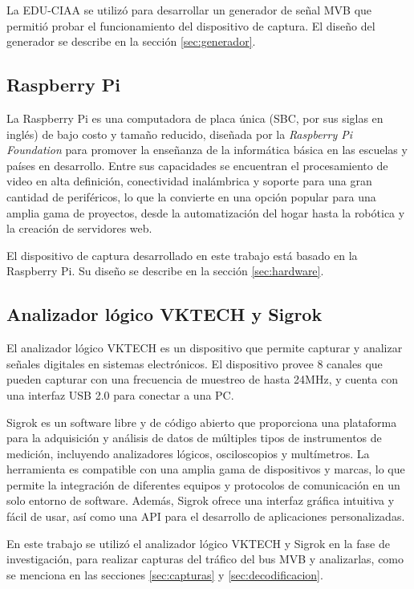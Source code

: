 La EDU-CIAA se utilizó para desarrollar un generador de señal MVB que permitió probar el funcionamiento del dispositivo de captura. El diseño del generador se describe en la sección \ref{sec:generador}.

\subsection{Raspberry Pi}

La Raspberry Pi \cite{web:rpi} es una computadora de placa única (SBC, por sus siglas en inglés) de bajo costo y tamaño reducido, diseñada por la \textit{Raspberry Pi Foundation} para promover la enseñanza de la informática básica en las escuelas y países en desarrollo.
Entre sus capacidades se encuentran el procesamiento de video en alta definición, conectividad inalámbrica y soporte para una gran cantidad de periféricos, lo que la convierte en una opción popular para una amplia gama de proyectos, desde la automatización del hogar hasta la robótica y la creación de servidores web.

El dispositivo de captura desarrollado en este trabajo está basado en la Raspberry Pi. Su diseño se describe en la sección \ref{sec:hardware}.

\subsection{Analizador lógico VKTECH y Sigrok}

El analizador lógico VKTECH \cite{vktech} es un dispositivo que permite capturar y analizar señales digitales en sistemas electrónicos. El dispositivo provee 8 canales que pueden capturar con una frecuencia de muestreo de hasta 24MHz, y cuenta con una interfaz USB 2.0 para conectar a una PC.

Sigrok \cite{sigrok} es un software libre y de código abierto que proporciona una plataforma para la adquisición y análisis de datos de múltiples tipos de instrumentos de medición, incluyendo analizadores lógicos, osciloscopios y multímetros. La herramienta es compatible con una amplia gama de dispositivos y marcas, lo que permite la integración de diferentes equipos y protocolos de comunicación en un solo entorno de software. Además, Sigrok ofrece una interfaz gráfica intuitiva y fácil de usar, así como una API para el desarrollo de aplicaciones personalizadas.

En este trabajo se utilizó el analizador lógico VKTECH y Sigrok en la fase de investigación, para realizar capturas del tráfico del bus MVB y analizarlas, como se menciona en las secciones \ref{sec:capturas} y \ref{sec:decodificacion}.

